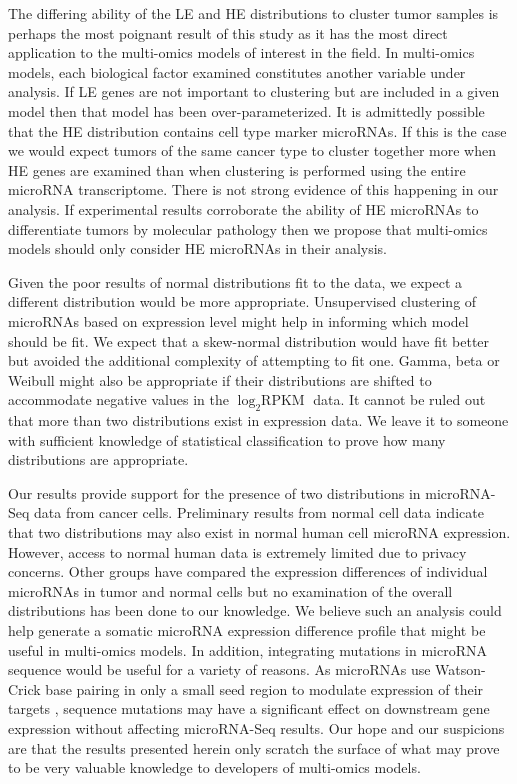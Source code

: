 \documentclass[12pt]{report}
\begin{document}
  The differing ability of the LE and HE distributions to cluster tumor samples 
  is perhaps the most poignant result of this study as it has the most direct 
  application to the multi-omics models of interest in the field. In multi-omics 
  models, each biological factor examined constitutes another variable under analysis. If 
  LE genes are not important to clustering but are included in a given model 
  then that model has been over-parameterized. It is admittedly possible that 
  the HE distribution contains cell type marker microRNAs. If this is the case 
  we would expect tumors of the same cancer type to cluster together more when 
  HE genes are examined than when clustering is performed using the entire 
  microRNA transcriptome. There is not strong evidence of this happening in our 
  analysis. If experimental results corroborate the ability of HE microRNAs to 
  differentiate tumors by molecular pathology then we propose that multi-omics 
  models should only consider HE microRNAs in their analysis.
  
  Given the poor results of normal distributions fit to the data, we expect a 
  different distribution would be more appropriate. Unsupervised clustering
  of microRNAs based on expression level might help in informing 
  which model should be fit. We expect that a skew-normal distribution would 
  have fit better but avoided the additional complexity of attempting to fit 
  one. Gamma, beta or Weibull might also be appropriate if their distributions 
  are shifted to accommodate negative values in the $\log_{2} \text{RPKM}$ data.
  It cannot be ruled out that more than two distributions exist in expression data. 
  We leave it to someone with sufficient knowledge of statistical classification 
  to prove how many distributions are appropriate.
  
  
 Our results provide support for the presence of two distributions in 
 microRNA-Seq data from cancer cells. Preliminary results from normal cell data 
 indicate that two distributions may also exist in normal human cell microRNA 
 expression. However, access to normal human data is extremely limited due to 
 privacy concerns. Other groups have compared the expression differences of 
 individual microRNAs in tumor and normal cells but no examination of the 
 overall distributions has been done to our knowledge. We believe such an 
 analysis could help generate a somatic microRNA expression difference profile 
 that might be useful in multi-omics models. In addition, integrating mutations 
 in microRNA sequence would be useful for a variety of reasons. As microRNAs use 
 Watson-Crick base pairing in only a small seed region to modulate expression of their targets \cite{Bartel2009}, sequence 
 mutations may have a significant effect on downstream gene expression without 
 affecting microRNA-Seq results. Our hope and our suspicions are that the 
 results presented herein only scratch the surface of what may prove to be very 
 valuable knowledge to developers of multi-omics models.
  
  
  



\end{document}
